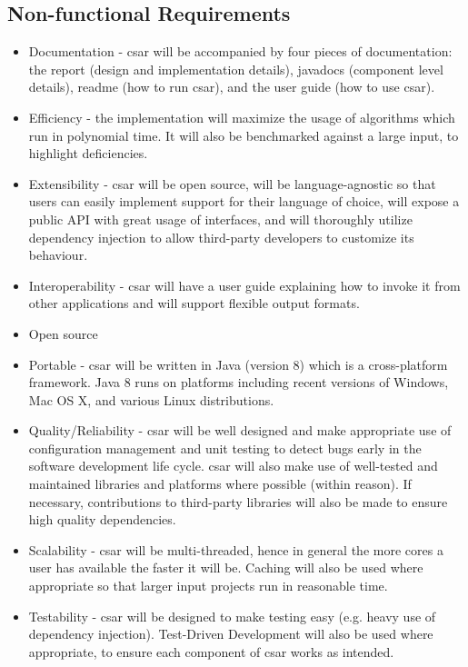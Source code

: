 \documentclass[12pt, letterpaper]{article}
\begin{document}
\subsection{Non-functional Requirements}
\begin{itemize}
  \item Documentation - csar will be accompanied by four pieces of documentation: the report (design and implementation details), javadocs (component level details), readme (how to run csar), and the user guide (how to use csar).
  \item Efficiency - the implementation will maximize the usage of algorithms which run in polynomial time.
  It will also be benchmarked against a large input, to highlight deficiencies.
  \item Extensibility - csar will be open source, will be language-agnostic so that users can easily implement support for their language of choice, will expose a public API with great usage of interfaces, and will thoroughly utilize dependency injection to allow third-party developers to customize its behaviour.
  \item Interoperability - csar will have a user guide explaining how to invoke it from other applications and will support flexible output formats.
  \item Open source
  \item Portable - csar will be written in Java (version 8) which is a cross-platform framework.
  Java 8 runs on platforms including recent versions of Windows, Mac OS X, and various Linux distributions. \autocite{javasysreqs}
  \item Quality/Reliability - csar will be well designed and make appropriate use of configuration management and unit testing to detect bugs early in the software development life cycle.
  csar will also make use of well-tested and maintained libraries and platforms where possible (within reason).
  If necessary, contributions to third-party libraries will also be made to ensure high quality dependencies.
  \item Scalability - csar will be multi-threaded, hence in general the more cores a user has available the faster it will be.
  Caching will also be used where appropriate so that larger input projects run in reasonable time.
  \item Testability - csar will be designed to make testing easy (e.g. heavy use of dependency injection).
  Test-Driven Development will also be used where appropriate, to ensure each component of csar works as intended.
\end{itemize}
\end{document}
